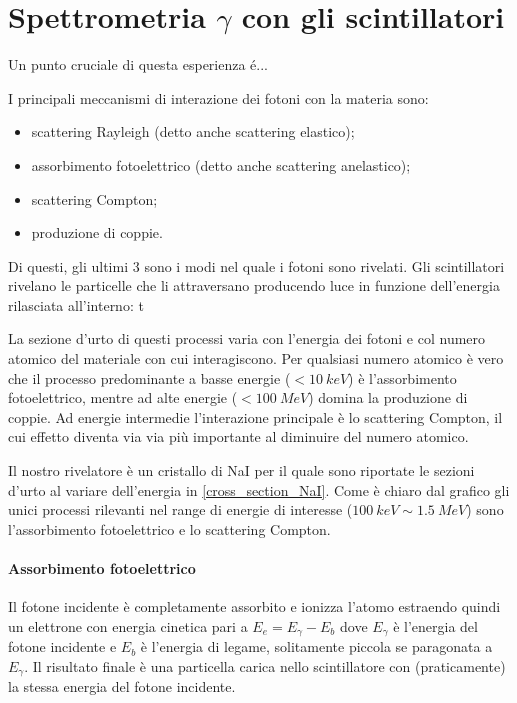 \section{Spettrometria $\gamma$ con gli scintillatori}
Un punto cruciale di questa esperienza é...

I principali meccanismi di interazione dei fotoni con la materia sono:
\begin{itemize}
	\item scattering Rayleigh (detto anche scattering elastico);
	\item assorbimento fotoelettrico (detto anche scattering anelastico);
	\item scattering Compton;
	\item produzione di coppie.
\end{itemize}
 Di questi, gli ultimi 3 sono i modi nel quale i fotoni sono rivelati.
 Gli scintillatori rivelano le particelle che li attraversano producendo luce in funzione dell'energia rilasciata all'interno: t
 
 La sezione d'urto di questi processi varia con l'energia dei fotoni e col numero atomico del materiale con cui interagiscono.
 Per qualsiasi numero atomico è vero che il processo predominante a basse energie ($< \SI{10}{keV}$) è l'assorbimento fotoelettrico, mentre ad alte energie ($< \SI{100}{MeV}$) domina la produzione di coppie.
Ad energie intermedie l'interazione principale è lo scattering Compton, il cui effetto diventa via via più importante al diminuire del numero atomico. 
 
 Il nostro rivelatore è un cristallo di NaI per il quale sono riportate le sezioni d'urto al variare dell'energia in \autoref{cross_section_NaI}.
 Come è chiaro dal grafico gli unici processi rilevanti nel range di energie di interesse ($\SI{100}{keV} \sim \SI{1.5}{MeV}$) sono l'assorbimento fotoelettrico e lo scattering Compton.
 
 \paragraph{Assorbimento fotoelettrico}
 Il fotone incidente è completamente assorbito e ionizza l'atomo estraendo quindi un elettrone con energia cinetica pari a $E_e = E_{\gamma} - E_b$ dove $E_{\gamma}$ è l'energia del fotone incidente e $E_b$ è l'energia di legame, solitamente piccola se paragonata a $E_{\gamma}$. Il risultato finale è una particella carica nello scintillatore con (praticamente) la stessa energia del fotone incidente.


